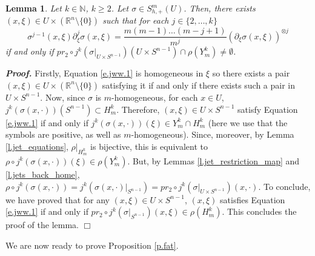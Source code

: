 \documentclass[10pt,twoside]{article}
\newcommand{\N}{\mathbb{N}}
\newcommand{\Rnzls}{\mathbb{R}^n\setminus\{0\}}
\newenvironment{prf}[1][]
{\vskip 2mm  {\it \bf Proof#1. }}{$\Box$ \vskip 2mm}
\numberwithin{theorem}{section}
\newtheorem{lemma}[theorem]{Lemma}
\begin{document}
\begin{lemma}\label{l.jets_we_want}
Let $k\in\N$, $k\geq 2$. Let $\sigma\in S^m_{h,+}(U)$. Then, there exists $(x,\xi)\in U\times(\Rnzls)$ such that for each $j\in\{2,\dots,k\}$
\begin{equation}\label{e.jww.1}
\sigma^{j-1}(x,\xi)\partial_\xi^j\sigma(x,\xi)=\frac{m(m-1)\dots(m-j+1)}{m^j}\left(\partial_\xi\sigma(x,\xi)\right)^{\otimes j}
\end{equation}
if and only if $pr_2\circ j^k\left(\sigma|_{U\times S^{n-1}}\right)\left(U\times S^{n-1}\right)\cap \rho\left(Y^k_m\right)\neq\emptyset$.
\end{lemma}
\begin{prf}
Firstly, Equation \eqref{e.jww.1} is homogeneous in $\xi$ so there exists a pair $(x,\xi)\in U\times(\Rnzls)$ satisfying it if and only if there exists such a pair in $U\times S^{n-1}$. Now, since $\sigma$ is $m$-homogeneous, for each $x\in U$, $j^k(\sigma(x,\cdot))(S^{n-1})\subset H^k_m$. Therefore, $(x,\xi)\in U\times S^{n-1}$ satisfy Equation \eqref{e.jww.1} if and only if $j^k(\sigma(x,\cdot))(\xi)\in Y^k_m\cap H^k_m$ (here we use that the symbols are positive, as well as $m$-homogeneous). Since, moreover, by Lemma \ref{l.jet_equations}, $\rho|_{H^k_m}$ is bijective, this is equivalent to $\rho\circ j^k(\sigma(x,\cdot))(\xi)\in\rho(Y^k_m)$. But, by Lemmas \ref{l.jet_restriction_map} and \ref{l.jets_back_home}, $\rho\circ j^k(\sigma(x,\cdot))=j^k(\sigma(x,\cdot)|_{S^{n-1}})=pr_2\circ j^k\left(\sigma|_{U\times S^{n-1}}\right)(x,\cdot)$. To conclude, we have proved that for any $(x,\xi)\in U\times S^{n-1}$, $(x,\xi)$ satisfies Equation \eqref{e.jww.1} if and only if $pr_2\circ j^k\left(\sigma|_{S^{n-1}}\right)(x,\xi)\in\rho\left(H^k_m\right)$. This concludes the proof of the lemma.
\end{prf}

We are now ready to prove Proposition \ref{p.fat}.
\end{document}
